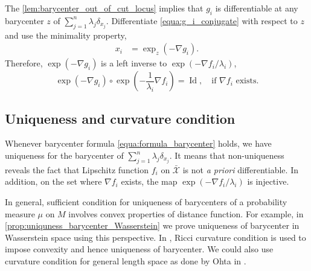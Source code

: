 The \cref{lem:barycenter_out_of_cut_locus} implies that $g_i$ is differentiable at
any barycenter $z$ of $\sum_{j=1}^n \lambda_j \delta_{x_j}$.
Differentiate \cref{equa:g_i_conjugate} with respect to %
$z$ and use the minimality property,
\begin{align*}
	x_i & = \exp_{z}( - \nabla g_i).
\end{align*}
Therefore, $ \exp(- \nabla g_i) $ is a left inverse to $\exp( - \nabla f_i / \lambda_i)$,
\[
	\exp( - \nabla g_i) \circ \exp( - \frac{1}{\lambda_i} \nabla f_i) = \operatorname{Id},
	\quad \text{if } \nabla f_i \text{ exists}.
\]


\subsection{Uniqueness and curvature condition}

Whenever barycenter formula \cref{equa:formula_barycenter} holds,
we have uniqueness for the barycenter of $\sum_{j=1}^n \lambda_j \delta_{x_j}$.
It means that non-uniqueness reveals the fact that Lipschitz function
$f_i$ on $\bar{ \mathcal{X} }$ is not \emph{a priori} differentiable.
In addition, on the set where $\nabla f_i$ exists, the map
$\exp( -\nabla f_i / \lambda_i )$ is injective.

In general, sufficient condition for uniqueness of barycenters of a probability measure $\mu$ on $M$
involves convex properties of distance function.
For example, in \cref{prop:uniquness_barycenter_Wasserstein} we prove uniqueness of barycenter in Wasserstein space
using this perspective.
In \cite[Proposition IX.7.1]{chavel2006riemannian}, Ricci curvature condition is used
to impose convexity and hence uniqueness of barycenter.
We could also use curvature condition for general length space as done by Ohta in \cite{ohta2012barycenters}.

